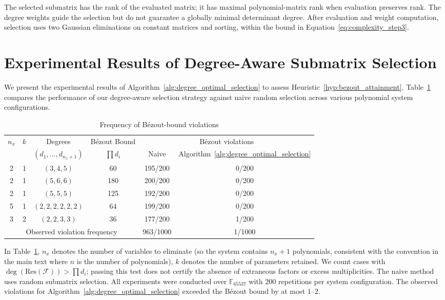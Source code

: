 The selected submatrix has the rank of the evaluated matrix; it has maximal polynomial-matrix rank when evaluation preserves rank. The degree weights guide the selection but do not guarantee a globally minimal determinant degree. After evaluation and weight computation, selection uses two Gaussian eliminations on constant matrices and sorting, within the bound in Equation~\eqref{eq:complexity_step3}. 


\newpage
\section{Experimental Results of Degree-Aware Submatrix Selection}\label{appendix:degree_optimal_exp}

We present the experimental results of Algorithm~\ref{alg:degree_optimal_selection} to assess Heuristic~\ref{hyp:bezout_attainment}. 
Table~\ref{tab:extraneous_factor_probability} compares the performance of our degree-aware selection strategy against naive random selection across various polynomial system configurations.

\begin{table}[htbp]
	\centering
	\caption{Frequency of B\'ezout-bound violations}
	\label{tab:extraneous_factor_probability}
	\begin{tabular}{cccccc}
		\hline
		\multirow{2}{*}{$n_x$} & \multirow{2}{*}{$k$} & Degrees & B\'ezout Bound & \multicolumn{2}{c}{B\'ezout violations} \\
		\cline{5-6}
		& & $(d_1,\ldots,d_{n_x+1})$ & $\prod d_i$ & Naive & Algorithm~\ref{alg:degree_optimal_selection} \\
		\hline
		2 & 1 & $(3,4,5)$ & 60 & 195/200 & 0/200 \\
		2 & 1 & $(5,6,6)$ & 180 & 200/200 & 0/200 \\
		2 & 1 & $(5,5,5)$ & 125 & 192/200 & 0/200 \\
		5 & 1 & $(2,2,2,2,2,2)$ & 64 & 199/200 & 0/200 \\
		3 & 2 & $(2,2,3,3)$ & 36 & 177/200 & 1/200 \\
		\hline
		\multicolumn{4}{c}{Observed violation frequency} & 963/1000 & 1/1000 \\
		\hline
	\end{tabular}
	
\end{table}

In Table~\ref{tab:extraneous_factor_probability}, $n_x$ denotes the number of variables to eliminate (so the system contains $n_x+1$ polynomials, consistent with the convention in the main text where $n$ is the number of polynomials),
$k$ denotes the number of parameters retained. We count cases with $\deg(\text{Res}(\mathcal{F})) > \prod d_i$; passing this test does not certify the absence of extraneous factors or excess multiplicities. The naive method uses random submatrix selection. All experiments were conducted over $\mathbb{F}_{65537}$ with 200 repetitions per system configuration. The observed violations for Algorithm~\ref{alg:degree_optimal_selection} exceeded the B\'ezout bound by at most $1$--$2$.

